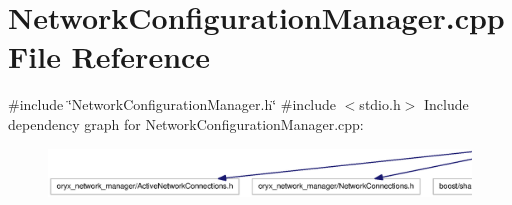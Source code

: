 \section{\-Network\-Configuration\-Manager.\-cpp \-File \-Reference}
\label{NetworkConfigurationManager_8cpp}
{\ttfamily \#include \char`\"{}\-Network\-Configuration\-Manager.\-h\char`\"{}}\*
{\ttfamily \#include $<$stdio.\-h$>$}\*
\-Include dependency graph for \-Network\-Configuration\-Manager.\-cpp\-:
\nopagebreak
\begin{figure}[H]
\begin{center}
\leavevmode
\includegraphics[width=350pt]{NetworkConfigurationManager_8cpp__incl}
\end{center}
\end{figure}
